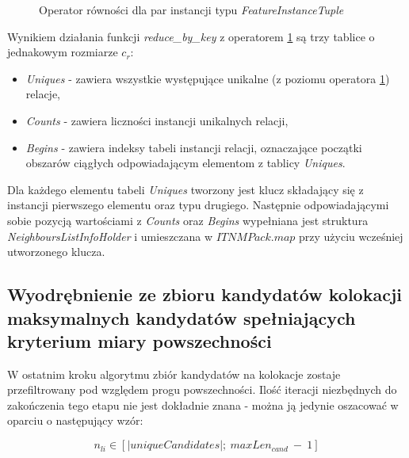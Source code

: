 \documentclass[12pt]{article}
\begin{document}
\begin{figure}[H]
\begin{algorithm}[H]
\caption{Operator równości dla par instancji typu \textit{FeatureInstanceTuple}}
\label{alg:FeatureInstanceTuple_operatorITNMPack}
\end{algorithm}
\end{figure}

Wynikiem działania funkcji \textit{reduce\_by\_key} z operatorem \ref{alg:FeatureInstanceTuple_operatorITNMPack} są trzy tablice o jednakowym rozmiarze $ c_{r} $:
\begin{itemize}
\item \textit{Uniques} - zawiera wszystkie występujące unikalne (z poziomu operatora \ref{alg:FeatureInstanceTuple_operatorITNMPack}) relacje,
\item \textit{Counts} - zawiera liczności instancji unikalnych relacji,
\item \textit{Begins} - zawiera indeksy tabeli instancji relacji, oznaczające początki obszarów ciągłych odpowiadającym elementom z tablicy \textit{Uniques}.
\end{itemize}

Dla każdego elementu tabeli \textit{Uniques} tworzony jest klucz składający się z instancji pierwszego elementu oraz typu drugiego. Następnie odpowiadającymi sobie pozycją wartościami z \textit{Counts} oraz \textit{Begins} wypełniana jest struktura \textit{NeighboursListInfoHolder} i umieszczana w $ ITNMPack.map $ przy użyciu wcześniej utworzonego klucza. 

\subsection{Wyodrębnienie ze zbioru kandydatów kolokacji maksymalnych kandydatów spełniających kryterium miary powszechności}

W ostatnim kroku algorytmu zbiór kandydatów na kolokacje zostaje przefiltrowany pod względem progu powszechności. Ilość iteracji niezbędnych do zakończenia tego etapu nie jest dokładnie znana - można ją jedynie oszacować w oparciu o następujący wzór:

\begin{equation}
n_{li} \in {[ |uniqueCandidates|;\ maxLen_{cand}\ -\ 1 ]}
\end{equation}
\end{document}
